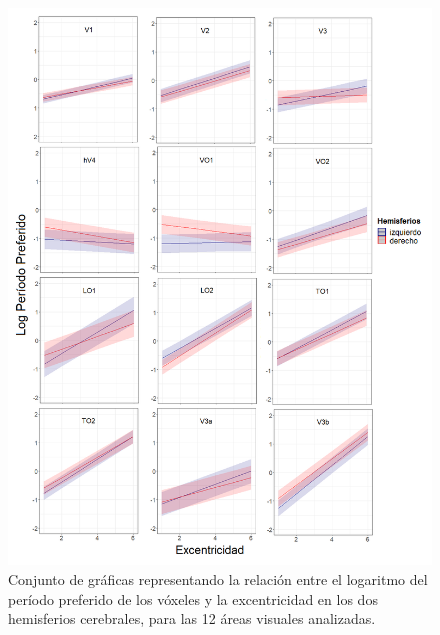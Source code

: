 \begin{figure}[h]
	\centering
	\includegraphics[scale=0.5]{Graphics/compuesto_rois_pp_vs_eccen_hem}
	\caption{Conjunto de gráficas representando la relación entre el logaritmo del per\'iodo preferido de los v\'oxeles y la excentricidad en los dos hemisferios cerebrales, para las 12 áreas visuales analizadas.}
	\label{fig:hem}
\end{figure}













